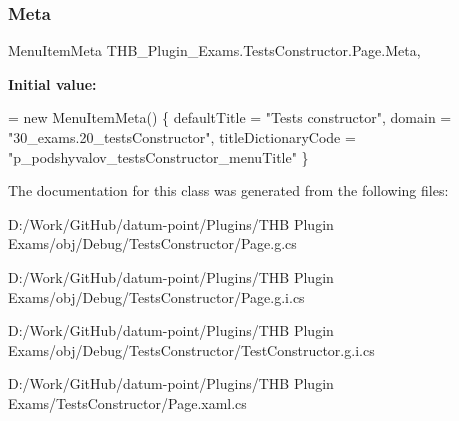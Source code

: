 \subsubsection{\texorpdfstring{Meta}{Meta}}
{\footnotesize\ttfamily Menu\+Item\+Meta T\+H\+B\+\_\+\+Plugin\+\_\+\+Exams.\+Tests\+Constructor.\+Page.\+Meta\hspace{0.3cm}{\ttfamily [get]}, {\ttfamily [set]}}

{\bfseries Initial value\+:}
\begin{DoxyCode}
= \textcolor{keyword}{new} MenuItemMeta() \{
            defaultTitle = \textcolor{stringliteral}{"Tests constructor"},
            domain = \textcolor{stringliteral}{"30\_exams.20\_testsConstructor"},
            titleDictionaryCode = \textcolor{stringliteral}{"p\_podshyvalov\_testsConstructor\_menuTitle"} \}
\end{DoxyCode}


The documentation for this class was generated from the following files\+:\begin{DoxyCompactItemize}
\item 
D\+:/\+Work/\+Git\+Hub/datum-\/point/\+Plugins/\+T\+H\+B Plugin Exams/obj/\+Debug/\+Tests\+Constructor/Page.\+g.\+cs\item 
D\+:/\+Work/\+Git\+Hub/datum-\/point/\+Plugins/\+T\+H\+B Plugin Exams/obj/\+Debug/\+Tests\+Constructor/Page.\+g.\+i.\+cs\item 
D\+:/\+Work/\+Git\+Hub/datum-\/point/\+Plugins/\+T\+H\+B Plugin Exams/obj/\+Debug/\+Tests\+Constructor/Test\+Constructor.\+g.\+i.\+cs\item 
D\+:/\+Work/\+Git\+Hub/datum-\/point/\+Plugins/\+T\+H\+B Plugin Exams/\+Tests\+Constructor/Page.\+xaml.\+cs\end{DoxyCompactItemize}
